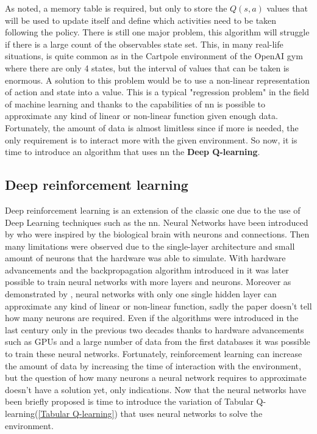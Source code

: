 As noted, a memory table is required, but only to store the $Q(s, a)$ values that will be used to update itself and define which activities need to be taken following the policy.
There is still one major problem, this algorithm will struggle if there is a large count of the observables state set. This, in many real-life situations, is quite common as in the Cartpole environment of the OpenAI gym where there are only 4 states, but the interval of values that can be taken is enormous.
A solution to this problem would be to use a non-linear representation of action and state into a value. This is a typical "regression problem" in the field of machine learning and thanks to the capabilities of \acrfull{nn} is possible to approximate any kind of linear or non-linear function given enough data. Fortunately, the amount of data is almost limitless since if more is needed, the only requirement is to interact more with the given environment. So now, it is time to introduce an algorithm that uses \acrshort{nn} the \textbf{Deep Q-learning}.
\subsection{Deep reinforcement learning}
Deep reinforcement learning is an extension of the classic one due to the use of Deep Learning techniques such as the \acrfull{nn}. Neural Networks have been introduced by \cite{Rosenblatt1958ThePA} who were inspired by the biological brain with neurons and connections. Then many limitations were observed due to the single-layer architecture and small amount of neurons that the hardware was able to simulate. With hardware advancements and the backpropagation algorithm introduced in \cite{backpropagation} it was later possible to train neural networks with more layers and neurons. Moreover as demonstrated by \cite{universals}, neural networks with only one single hidden layer can approximate any kind of linear or non-linear function, sadly the paper doesn't tell how many neurons are required. 
Even if the algorithms were introduced in the last century only in the previous two decades thanks to hardware advancements such as GPUs and a large number of data from the first databases it was possible to train these neural networks.
Fortunately, reinforcement learning can increase the amount of data by increasing the time of interaction with the environment, but the question of how many neurons a neural network requires to approximate doesn't have a solution yet, only indications.
Now that the neural networks have been briefly proposed is time to introduce the variation of Tabular Q-learning(\ref{Tabular Q-learning}) that uses neural networks to solve the environment.
